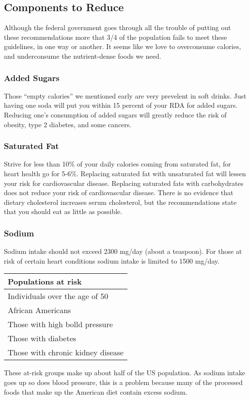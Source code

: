 \documentclass[letterpaper, 11pt]{article}
\begin{document}
\subsection{Components to Reduce}
\label{sec:org3844556}
Although the federal government goes through all the trouble of putting out these recommendations more that 3/4 of the population fails to meet these guidelines, in one way or another. It seems like we love to overconsume calories, and underconsume the nutrient-dense foods we need.\\
\subsubsection{Added Sugars}
\label{sec:orgd9aa72c}
Those ``empty calories'' we mentioned early are very prevelent in soft drinks. Just having one soda will put you within 15 percent of your RDA for added sugars. Reducing one's consumption of added sugars will greatly reduce the risk of obesity, type 2 diabetes, and some cancers.\\
\subsubsection{Saturated Fat}
\label{sec:org2b2e56f}
Strive for less than 10\% of your daily calories coming from saturated fat, for heart health go for 5-6\%. Replacing saturated fat with unsaturated fat will lessen your risk for cardiovascular disease. Replacing saturated fats with carbohydrates does not reduce your risk of cardiovascular disease. There is no evidence that dietary cholesterol increases serum cholesterol, but the recommendations state that you should eat as little as possible.\\
\subsubsection{Sodium}
\label{sec:orgfdbb39e}
Sodium intake should not exceed 2300 mg/day (about a teaspoon). For those at risk of certain heart conditions sodium intake is limited to 1500 mg/day.\\
\begin{center}
\begin{tabular}{l}
Populations at risk\\
\hline
Individuals over the age of 50\\
African Americans\\
Those with high bolld pressure\\
Those with diabetes\\
Those with chronic kidney disease\\
\end{tabular}
\end{center}
These at-risk groups make up about half of the US population. As sodium intake goes up so does blood pressure, this is a problem because many of the processed foods that make up the American diet contain excess sodium.\\
\end{document}
